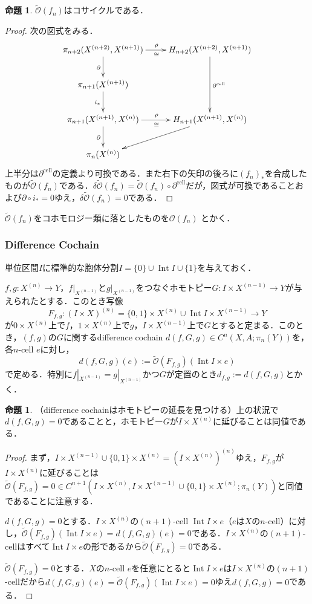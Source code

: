 \documentclass[a4paper,11pt]{jsarticle}
\theoremstyle{definition}
\newtheorem{prop}[thm]{命題}
\DeclareMathOperator{\Int}{\mathrm{Int}}
\begin{document}
\begin{prop}
  $\tilde{\mathcal{O}}(f_n)$はコサイクルである．
\end{prop}
\begin{proof}
  次の図式をみる．
  \[\xymatrix{\pi_{n+2}(X^{(n+2)},X^{(n+1)})\ar[r]^{\rho}_\cong\ar[d]_\partial& H_{n+2}(X^{(n+2)},X^{(n+1)})\ar[dd]^{\partial^\mathrm{cell}}\\
  \pi_{n+1}(X^{(n+1)})\ar[d]_{i_*}&\\
  \pi_{n+1}(X^{(n+1)},X^{(n)})\ar[r]^\rho_\cong\ar[d]_\partial&H_{n+1}(X^{(n+1)},X^{(n)})\ar[ld]\\
  \pi_n(X^{(n)})&}
  \]
  上半分は$\partial^\mathrm{cell}$の定義より可換である．また右下の矢印の後ろに$(f_n)_*$を合成したものが$\tilde{\mathcal O}(f_n)$である．$\delta \tilde{\mathcal O}(f_n)=\tilde{\mathcal{O}}(f_n)\circ\partial^\mathrm{cell}$だが，図式が可換であることおよび$\partial\circ i_*=0$ゆえ，$\delta\tilde{\mathcal O}(f_n)=0$である．
\end{proof}
$\tilde{\mathcal{O}}(f_n)$をコホモロジー類に落としたものを$\mathcal{O}(f_n)$
とかく．

\subsubsection{Difference Cochain}
単位区間$I$に標準的な胞体分割$I=\{0\}\cup \Int I\cup\{1\}$を与えておく．

$f,g\colon X^{(n)}\to Y$，$f|_{X^{(n-1)}}$と$g|_{X^{(n-1)}}$をつなぐホモトピー$G\colon I\times X^{(n-1)}\to Y$が与えられたとする．このとき写像
\[
  F_{f,g}\colon (I\times X)^{(n)}=\{0,1\}\times X^{(n)}\cup\Int I\times X^{(n-1)}\to Y
\]
が$0\times X^{(n)}$上で$f$，$1\times X^{(n)}$上で$g$，$I\times X^{(n-1)}$上で$G$とすると定まる．このとき，$(f,g)$の$G$に関するdifference cochain $d(f,G,g)\in C^n(X,A;\pi_n(Y))$を，各$n$-cell $e$に対し，
\[
  d(f,G,g)(e):=\tilde{\mathcal{O}}(F_{f,g})(\Int I\times e)
\]
で定める．特別に$f|_{X^{(n-1)}}=g|_{X^{(n-1)}}$かつ$G$が定置のとき$d_{f,g}:=d(f,G,g)$とかく．

\begin{prop}
  （difference cochainはホモトピーの延長を見つける）上の状況で$d(f,G,g)=0$であることと，ホモトピー$G$が$I\times X^{(n)}$に延びることは同値である．
\end{prop}
\begin{proof}
  まず，$I\times X^{(n-1)}\cup \{0,1\}\times X^{(n)}=(I\times X^{(n)})^{(n)}$ゆえ，$F_{f,g}$が$I\times X^{(n)}$に延びることは$\tilde{\mathcal{O}}(F_{f,g})=0\in C^{n+1}(I\times X^{(n)},I\times X^{(n-1)}\cup \{0,1\}\times X^{(n)};\pi_n(Y))$と同値であることに注意する．

  $d(f,G,g)=0$とする．$I\times X^{(n)}$の$(n+1)$-cell $\Int I\times e$（$e$は$X$の$n$-cell）に対し，$\tilde{\mathcal{O}}(F_{f,g})(\Int I\times e)=d(f,G,g)(e)=0$である．$I\times X^{(n)}$の$(n+1)$-cellはすべて$\Int I\times e$の形であるから$\tilde{\mathcal{O}}(F_{f,g})=0$である．

  $\tilde{\mathcal{O}}(F_{f,g})=0$とする．$X$の$n$-cell $e$を任意にとると$\Int I\times e$は$I\times X^{(n)}$の$(n+1)$-cellだから$d(f,G,g)(e)=\tilde{\mathcal{O}}(F_{f,g})(\Int I\times e)=0$ゆえ$d(f,G,g)=0$である．
\end{proof}
\end{document}
